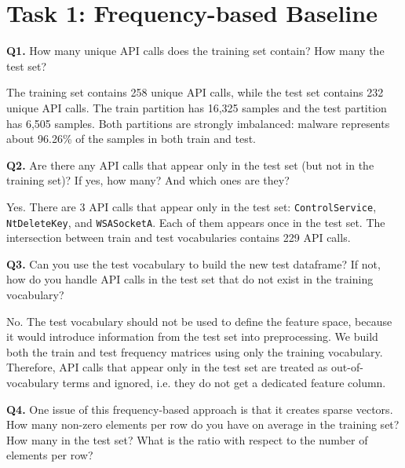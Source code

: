 \section{Task 1: Frequency-based Baseline}

\begin{questionbox}
\textbf{Q1.} How many unique API calls does the training set contain? How many the test set?
\end{questionbox}

The training set contains 258 unique API calls, while the test set contains 232 unique API calls.
The train partition has 16,325 samples and the test partition has 6,505 samples. Both partitions
are strongly imbalanced: malware represents about 96.26\% of the samples in both train and test.

\begin{questionbox}
\textbf{Q2.} Are there any API calls that appear only in the test set (but not in the training set)?
If yes, how many? And which ones are they?
\end{questionbox}

Yes. There are 3 API calls that appear only in the test set:
\texttt{ControlService}, \texttt{NtDeleteKey}, and \texttt{WSASocketA}. Each of them appears once
in the test set. The intersection between train and test vocabularies contains 229 API calls.

\begin{questionbox}
\textbf{Q3.} Can you use the test vocabulary to build the new test dataframe?
If not, how do you handle API calls in the test set that do not exist in the training vocabulary?
\end{questionbox}

No. The test vocabulary should not be used to define the feature space, because it would introduce
information from the test set into preprocessing. We build both the train and test frequency matrices
using only the training vocabulary. Therefore, API calls that appear only in the test set are treated
as out-of-vocabulary terms and ignored, i.e. they do not get a dedicated feature column.

\begin{questionbox}
\textbf{Q4.} One issue of this frequency-based approach is that it creates sparse vectors.
How many non-zero elements per row do you have on average in the training set?
How many in the test set?
What is the ratio with respect to the number of elements per row?
\end{questionbox}

